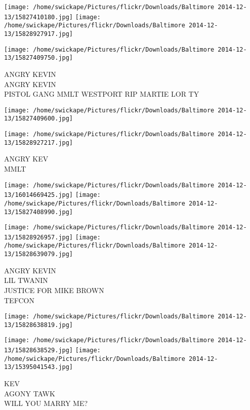 \documentclass[10pt,letterpaper]{article}
\begin{document}
\texttt{[image: /home/swickape/Pictures/flickr/Downloads/Baltimore 2014-12-13/15827410180.jpg]}
\texttt{[image: /home/swickape/Pictures/flickr/Downloads/Baltimore 2014-12-13/15828927917.jpg]}

\vspace{0.25in}
\texttt{[image: /home/swickape/Pictures/flickr/Downloads/Baltimore 2014-12-13/15827409750.jpg]}

ANGRY KEVIN\\
ANGRY KEVIN\\
PISTOL GANG MMLT WESTPORT RIP MARTIE LOR TY\\
\pagebreak

\texttt{[image: /home/swickape/Pictures/flickr/Downloads/Baltimore 2014-12-13/15827409600.jpg]}

\vspace{0.25in}
\texttt{[image: /home/swickape/Pictures/flickr/Downloads/Baltimore 2014-12-13/15828927217.jpg]}

ANGRY KEV\\
MMLT\\
\pagebreak

\texttt{[image: /home/swickape/Pictures/flickr/Downloads/Baltimore 2014-12-13/16014669425.jpg]}
\texttt{[image: /home/swickape/Pictures/flickr/Downloads/Baltimore 2014-12-13/15827408990.jpg]}

\texttt{[image: /home/swickape/Pictures/flickr/Downloads/Baltimore 2014-12-13/15828926957.jpg]}
\texttt{[image: /home/swickape/Pictures/flickr/Downloads/Baltimore 2014-12-13/15828639079.jpg]}

ANGRY KEVIN\\
LIL TWANIN\\
JUSTICE FOR MIKE BROWN\\
TEFCON\\
\pagebreak

\texttt{[image: /home/swickape/Pictures/flickr/Downloads/Baltimore 2014-12-13/15828638819.jpg]}

\vspace{0.25in}
\texttt{[image: /home/swickape/Pictures/flickr/Downloads/Baltimore 2014-12-13/15828638529.jpg]}
\texttt{[image: /home/swickape/Pictures/flickr/Downloads/Baltimore 2014-12-13/15395041543.jpg]}

KEV\\
AGONY TAWK\\
WILL YOU MARRY ME?\\
\pagebreak
\end{document}
